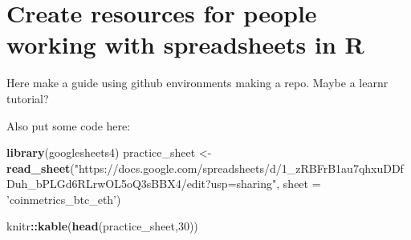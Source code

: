 \documentclass[
]{book}
\newenvironment{Shaded}{\begin{snugshade}}{\end{snugshade}}
\newcommand{\DataTypeTok}[1]{\textcolor[rgb]{0.13,0.29,0.53}{#1}}
\newcommand{\DecValTok}[1]{\textcolor[rgb]{0.00,0.00,0.81}{#1}}
\newcommand{\KeywordTok}[1]{\textcolor[rgb]{0.13,0.29,0.53}{\textbf{#1}}}
\newcommand{\NormalTok}[1]{#1}
\newcommand{\OperatorTok}[1]{\textcolor[rgb]{0.81,0.36,0.00}{\textbf{#1}}}
\newcommand{\StringTok}[1]{\textcolor[rgb]{0.31,0.60,0.02}{#1}}
\begin{document}
\hypertarget{create-resources-for-people-working-with-spreadsheets-in-r}{%
\section{Create resources for people working with spreadsheets in R}\label{create-resources-for-people-working-with-spreadsheets-in-r}}

Here make a guide using github environments making a repo. Maybe a learnr tutorial?

Also put some code here:

\begin{Shaded}
\begin{Highlighting}[]
\KeywordTok{library}\NormalTok{(googlesheets4)}
\NormalTok{practice_sheet <-}\StringTok{ }\KeywordTok{read_sheet}\NormalTok{(}\StringTok{"https://docs.google.com/spreadsheets/d/1_zRBFrB1au7qhxuDDfDuh_bPLGd6RLrwOL5oQ3sBBX4/edit?usp=sharing"}\NormalTok{, }\DataTypeTok{sheet =} \StringTok{'coinmetrics_btc_eth'}\NormalTok{)}
\end{Highlighting}
\end{Shaded}

\begin{Shaded}
\begin{Highlighting}[]
\NormalTok{knitr}\OperatorTok{::}\KeywordTok{kable}\NormalTok{(}\KeywordTok{head}\NormalTok{(practice_sheet,}\DecValTok{30}\NormalTok{))}
\end{Highlighting}
\end{Shaded}
\end{document}
